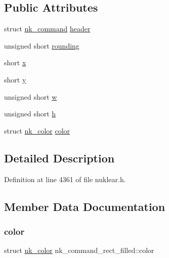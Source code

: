 \subsection*{Public Attributes}
\begin{DoxyCompactItemize}
\item 
struct \mbox{\hyperlink{structnk__command}{nk\+\_\+command}} \mbox{\hyperlink{structnk__command__rect__filled_a30ce332f6ffee33554f0847f273eeb08}{header}}
\item 
unsigned short \mbox{\hyperlink{structnk__command__rect__filled_aeeb368a566f41a7e7251f0d42beca769}{rounding}}
\item 
short \mbox{\hyperlink{structnk__command__rect__filled_a06cec93b095fc457ae510a417c0a8e20}{x}}
\item 
short \mbox{\hyperlink{structnk__command__rect__filled_a445d257d9223e67ebe2efb6dd1e9ddcb}{y}}
\item 
unsigned short \mbox{\hyperlink{structnk__command__rect__filled_aea649ea0e06951f6b43cf081e3ed46cb}{w}}
\item 
unsigned short \mbox{\hyperlink{structnk__command__rect__filled_af834a2f4ebaf9542858fe508a142008c}{h}}
\item 
struct \mbox{\hyperlink{structnk__color}{nk\+\_\+color}} \mbox{\hyperlink{structnk__command__rect__filled_af8a168369f9f434f67dab58fa2fa7fbb}{color}}
\end{DoxyCompactItemize}


\subsection{Detailed Description}


Definition at line 4361 of file nuklear.\+h.



\subsection{Member Data Documentation}
\mbox{\label{structnk__command__rect__filled_af8a168369f9f434f67dab58fa2fa7fbb}} 
\subsubsection{\texorpdfstring{color}{color}}
{\footnotesize\ttfamily struct \mbox{\hyperlink{structnk__color}{nk\+\_\+color}} nk\+\_\+command\+\_\+rect\+\_\+filled\+::color}



